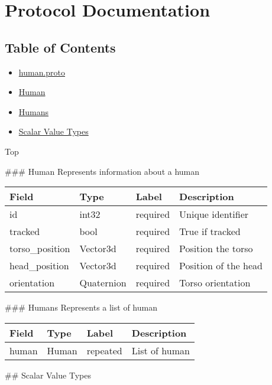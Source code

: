 \section{Protocol Documentation}\label{protocol-documentation}

\subsection{Table of Contents}\label{table-of-contents}

\begin{itemize}
\item
  \hyperref[human.proto]{human.proto}
\item
  \hyperref[experimot.msgs.Human]{Human}
\item
  \hyperref[experimot.msgs.Humans]{Humans}
\item
  \hyperref[scalar-value-types]{Scalar Value Types}
\end{itemize}

Top


 \#\#\# Human Represents information about a human

\begin{longtable}[c]{@{}llll@{}}
\toprule
Field & Type & Label & Description\tabularnewline
\midrule
\endhead
id & int32 & required & Unique identifier\tabularnewline
tracked & bool & required & True if tracked\tabularnewline
torso\_position & Vector3d & required & Position the
torso\tabularnewline
head\_position & Vector3d & required & Position of the
head\tabularnewline
orientation & Quaternion & required & Torso orientation\tabularnewline
\bottomrule
\end{longtable}

 \#\#\# Humans Represents a list of human

\begin{longtable}[c]{@{}llll@{}}
\toprule
Field & Type & Label & Description\tabularnewline
\midrule
\endhead
human & Human & repeated & List of human\tabularnewline
\bottomrule
\end{longtable}

 \#\# Scalar Value Types

